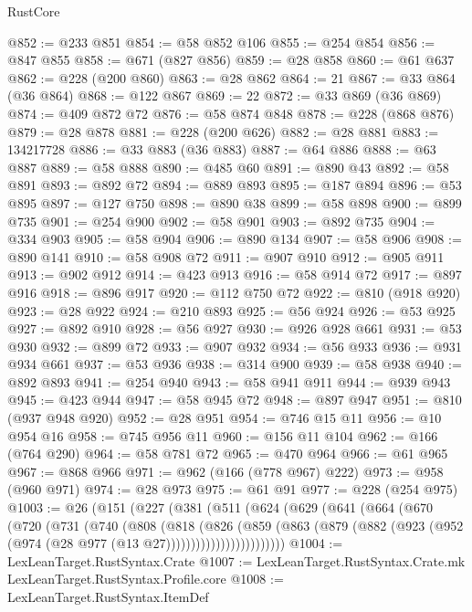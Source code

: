 \begin{lexlean}{RustCore}
\begin{coremodule}
@852 := @233 @851
@854 := @58 @852 @106
@855 := @254 @854
@856 := @847 @855
@858 := @671 (@827 @856)
@859 := @28 @858
@860 := @61 @637
@862 := @228 (@200 @860)
@863 := @28 @862
@864 := 21
@867 := @33 @864 (@36 @864)
@868 := @122 @867
@869 := 22
@872 := @33 @869 (@36 @869)
@874 := @409 @872 @72
@876 := @58 @874 @848
@878 := @228 (@868 @876)
@879 := @28 @878
@881 := @228 (@200 @626)
@882 := @28 @881
@883 := 134217728
@886 := @33 @883 (@36 @883)
@887 := @64 @886
@888 := @63 @887
@889 := @58 @888
@890 := @485 @60
@891 := @890 @43
@892 := @58 @891
@893 := @892 @72
@894 := @889 @893
@895 := @187 @894
@896 := @53 @895
@897 := @127 @750
@898 := @890 @38
@899 := @58 @898
@900 := @899 @735
@901 := @254 @900
@902 := @58 @901
@903 := @892 @735
@904 := @334 @903
@905 := @58 @904
@906 := @890 @134
@907 := @58 @906
@908 := @890 @141
@910 := @58 @908 @72
@911 := @907 @910
@912 := @905 @911
@913 := @902 @912
@914 := @423 @913
@916 := @58 @914 @72
@917 := @897 @916
@918 := @896 @917
@920 := @112 @750 @72
@922 := @810 (@918 @920)
@923 := @28 @922
@924 := @210 @893
@925 := @56 @924
@926 := @53 @925
@927 := @892 @910
@928 := @56 @927
@930 := @926 @928 @661
@931 := @53 @930
@932 := @899 @72
@933 := @907 @932
@934 := @56 @933
@936 := @931 @934 @661
@937 := @53 @936
@938 := @314 @900
@939 := @58 @938
@940 := @892 @893
@941 := @254 @940
@943 := @58 @941 @911
@944 := @939 @943
@945 := @423 @944
@947 := @58 @945 @72
@948 := @897 @947
@951 := @810 (@937 @948 @920)
@952 := @28 @951
@954 := @746 @15 @11
@956 := @10 @954 @16
@958 := @745 @956 @11
@960 := @156 @11 @104
@962 := @166 (@764 @290)
@964 := @58 @781 @72
@965 := @470 @964
@966 := @61 @965
@967 := @868 @966
@971 := @962 (@166 (@778 @967) @222)
@973 := @958 (@960 @971)
@974 := @28 @973
@975 := @61 @91
@977 := @228 (@254 @975)
@1003 := @26
    (@151
      (@227
        (@381
          (@511
            (@624
              (@629
                (@641
                  (@664
                    (@670
                      (@720
                        (@731
                          (@740
                            (@808
                              (@818
                                (@826
                                  (@859
                                    (@863
                                      (@879
                                        (@882
                                          (@923
                                            (@952 (@974 (@28 @977 (@13 @27))))))))))))))))))))))))
@1004 := LexLeanTarget.RustSyntax.Crate
@1007 := LexLeanTarget.RustSyntax.Crate.mk LexLeanTarget.RustSyntax.Profile.core
@1008 := LexLeanTarget.RustSyntax.ItemDef

\end{coremodule}
\end{lexlean}
